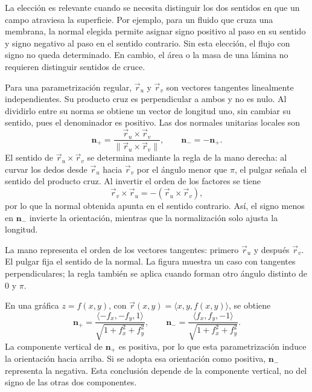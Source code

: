 La elección es relevante cuando se necesita distinguir los dos sentidos en que un campo atraviesa la superficie. Por ejemplo, para un fluido que cruza una membrana, la normal elegida permite asignar signo positivo al paso en su sentido y signo negativo al paso en el sentido contrario. Sin esta elección, el flujo con signo no queda determinado. En cambio, el área o la masa de una lámina no requieren distinguir sentidos de cruce.

Para una parametrización regular, $\vec r_u$ y $\vec r_v$ son vectores tangentes linealmente independientes. Su producto cruz es perpendicular a ambos y no es nulo. Al dividirlo entre su norma se obtiene un vector de longitud uno, sin cambiar su sentido, pues el denominador es positivo. Las dos normales unitarias locales son
\[
\mathbf n_{+}=\frac{\vec r_u\times\vec r_v}
{\lVert\vec r_u\times\vec r_v\rVert},
\qquad
\mathbf n_{-}=-\mathbf n_{+}.
\]
El sentido de $\vec r_u\times\vec r_v$ se determina mediante la regla de la mano derecha: al curvar los dedos desde $\vec r_u$ hacia $\vec r_v$ por el ángulo menor que $\pi$, el pulgar señala el sentido del producto cruz. Al invertir el orden de los factores se tiene
\[
\vec r_v\times\vec r_u=-(\vec r_u\times\vec r_v),
\]
por lo que la normal obtenida apunta en el sentido contrario. Así, el signo menos en $\mathbf n_{-}$ invierte la orientación, mientras que la normalización solo ajusta la longitud.
\begin{center}
\begin{minipage}{.9\textwidth}
\centering
\begingroup\shorthandoff{>}
\def\manoPrimero{\vec r_u}\def\manoSegundo{\vec r_v}\def\manoResultado{\vec r_u\times\vec r_v}

\endgroup
\par\smallskip
La mano representa el orden de los vectores tangentes: primero $\vec r_u$ y después $\vec r_v$. El pulgar fija el sentido de la normal. La figura muestra un caso con tangentes perpendiculares; la regla también se aplica cuando forman otro ángulo distinto de $0$ y $\pi$.
\end{minipage}
\end{center}


En una gráfica $z=f(x,y)$, con $\vec r(x,y)=\langle x,y,f(x,y)\rangle$, se obtiene
\[
\mathbf n_{+}=\frac{\langle-f_x,-f_y,1\rangle}
{\sqrt{1+f_x^2+f_y^2}},
\qquad
\mathbf n_{-}=\frac{\langle f_x,f_y,-1\rangle}
{\sqrt{1+f_x^2+f_y^2}}.
\]
La componente vertical de $\mathbf n_{+}$ es positiva, por lo que esta parametrización induce la orientación hacia arriba. Si se adopta esa orientación como positiva, $\mathbf n_{-}$ representa la negativa. Esta conclusión depende de la componente vertical, no del signo de las otras dos componentes.

